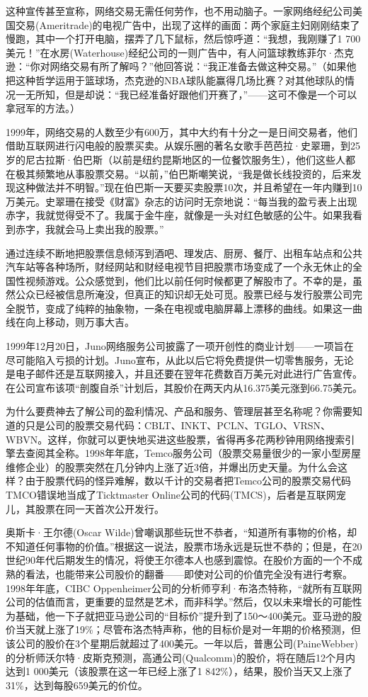 \documentclass[12pt,oneside]{book}
\begin{document}
这种宣传甚至宣称，网络交易无需任何劳作，也不用动脑子。一家网络经纪公司美国交易(Ameritrade)的电视广告中，出现了这样的画面：两个家庭主妇刚刚结束了慢跑，其中一个打开电脑，摆弄了几下鼠标，然后惊呼道：“我想，我刚赚了1 700美元！”在水房(Waterhouse)经纪公司的一则广告中，有人问篮球教练菲尔·杰克逊：“你对网络交易有所了解吗？”他回答说：“我正准备去做这种交易。”（如果他把这种哲学运用于篮球场，杰克逊的NBA球队能赢得几场比赛？对其他球队的情况一无所知，但是却说：“我已经准备好跟他们开赛了，”——这可不像是一个可以拿冠军的方法。）

1999年，网络交易的人数至少有600万，其中大约有十分之一是日间交易者，他们借助互联网进行闪电般的股票买卖。从娱乐圈的著名女歌手芭芭拉·史翠珊，到25岁的尼古拉斯·伯巴斯（以前是纽约昆斯地区的一位餐饮服务生），他们这些人都在极其频繁地从事股票交易。“以前，”伯巴斯嘲笑说，“我是做长线投资的，后来发现这种做法并不明智。”现在伯巴斯一天要买卖股票10次，并且希望在一年内赚到10万美元。史翠珊在接受《财富》杂志的访问时无奈地说：“每当我的盈亏表上出现赤字，我就觉得受不了。我属于金牛座，就像是一头对红色敏感的公牛。如果我看到赤字，我就会马上卖出我的股票。”

通过连续不断地把股票信息倾泻到酒吧、理发店、厨房、餐厅、出租车站点和公共汽车站等各种场所，财经网站和财经电视节目把股票市场变成了一个永无休止的全国性视频游戏。公众感觉到，他们比以前任何时候都更了解股市了。不幸的是，虽然公众已经被信息所淹没，但真正的知识却无处可觅。股票已经与发行股票公司完全脱节，变成了纯粹的抽象物，一条在电视或电脑屏幕上漂移的曲线。如果这一曲线在向上移动，则万事大吉。

1999年12月20日，Juno网络服务公司披露了一项开创性的商业计划——一项旨在尽可能陷入亏损的计划。Juno宣布，从此以后它将免费提供一切零售服务，无论是电子邮件还是互联网接入，并且还要在翌年花费数百万美元对此进行广告宣传。在公司宣布该项“剖腹自杀”计划后，其股价在两天内从16.375美元涨到66.75美元。

为什么要费神去了解公司的盈利情况、产品和服务、管理层甚至名称呢？你需要知道的只是公司的股票交易代码：CBLT、INKT、PCLN、TGLO、VRSN、WBVN。这样，你就可以更快地买进这些股票，省得再多花两秒钟用网络搜索引擎去查阅其全称。1998年年底，Temco服务公司（股票交易量很少的一家小型房屋维修企业）的股票突然在几分钟内上涨了近3倍，并爆出历史天量。为什么会这样？由于股票代码的怪异难解，数以千计的交易者把Temco公司的股票交易代码TMCO错误地当成了Ticktmaster Online公司的代码(TMCS)，后者是互联网宠儿，其股票在同一天首次公开发行。

奥斯卡·王尔德(Oscar Wilde)曾嘲讽那些玩世不恭者，“知道所有事物的价格，却不知道任何事物的价值。”根据这一说法，股票市场永远是玩世不恭的；但是，在20世纪90年代后期发生的情况，将使王尔德本人也感到震惊。在股价方面的一个不成熟的看法，也能带来公司股价的翻番——即使对公司的价值完全没有进行考察。1998年年底，CIBC Oppenheimer公司的分析师亨利·布洛杰特称，“就所有互联网公司的估值而言，更重要的显然是艺术，而非科学。”然后，仅以未来增长的可能性为基础，他一下子就把亚马逊公司的“目标价”提升到了150～400美元。亚马逊的股价当天就上涨了19\%；尽管布洛杰特声称，他的目标价是对一年期的价格预测，但该公司的股价在3个星期后就超过了400美元。一年以后，普惠公司(PaineWebber)的分析师沃尔特·皮斯克预测，高通公司(Qualcomm)的股价，将在随后12个月内达到1 000美元（该股票在这一年已经上涨了1 842\%），结果，股价当天又上涨了31\%，达到每股659美元的价位。
\end{document}

